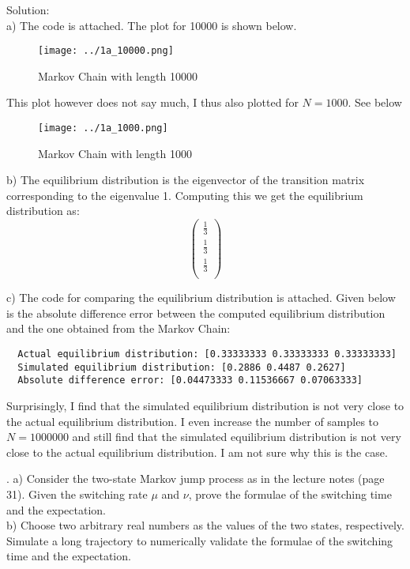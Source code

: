 \documentclass[a4paper,notitlepage,cs4size,cap,indent,oneside,12pt]{article}
\numberwithin{equation}{section}
\numberwithin{figure}{section}
\newcommand{\blue}{\color{blue}}
\begin{document}
{\blue
\noindent Solution: \\
a) The code is attached. The plot for 10000 is shown below.
\begin{figure}[H]
  \centering
  \texttt{[image: ../1a\_10000.png]}
  \caption{Markov Chain with length 10000}
\end{figure}
This plot however does not say much, I thus also plotted for $N = 1000$. See below
\begin{figure}[H]
  \centering
  \texttt{[image: ../1a\_1000.png]}
  \caption{Markov Chain with length 1000}
\end{figure}

b) The equilibrium distribution is the eigenvector of the transition matrix corresponding to the eigenvalue 1. Computing this we get the equilibrium distribution as:
\begin{equation*}
\left(
  \begin{array}{c}
    \frac{1}{3} \\
    \frac{1}{3} \\
    \frac{1}{3} \\
  \end{array}
\right)
\end{equation*}

c) The code for comparing the equilibrium distribution is attached. Given below is the absolute difference error between the computed equilibrium distribution and the one obtained from the Markov Chain:
\begin{verbatim}
  Actual equilibrium distribution: [0.33333333 0.33333333 0.33333333]
  Simulated equilibrium distribution: [0.2886 0.4487 0.2627]
  Absolute difference error: [0.04473333 0.11536667 0.07063333]
\end{verbatim}
Surprisingly, I find that the simulated equilibrium distribution is not very close to the actual equilibrium distribution. I even increase the number of samples to $N = 1000000$ and still find that the simulated equilibrium distribution is not very close to the actual equilibrium distribution. I am not sure why this is the case.\\
}

. a) Consider the two-state Markov jump process as in the lecture notes (page 31). Given the switching rate $\mu$ and $\nu$, prove the formulae of the switching time and the expectation.\\
b) Choose two arbitrary real numbers as the values of the two states, respectively. Simulate a long trajectory to numerically validate the formulae of the switching time and the expectation.  \\~
\end{document}
